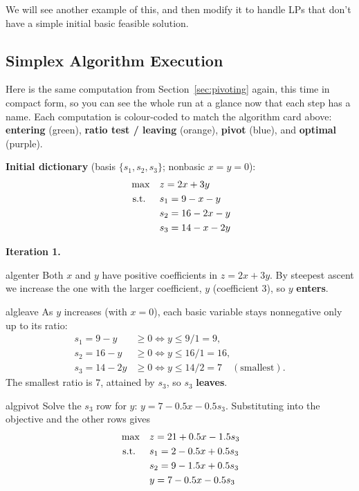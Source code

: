 We will see another example of this, and then modify it to handle LPs that don't have a simple initial basic feasible solution.

\subsection{Simplex Algorithm Execution}

Here is the same computation from Section~\ref{sec:pivoting} again, this time in compact form, so you can see the whole run at a glance now that each step has a name. Each computation is colour-coded to match the algorithm card above: {\color{algenter}\textbf{entering}} (green), {\color{algleave}\textbf{ratio test / leaving}} (orange), {\color{algpivot}\textbf{pivot}} (blue), and {\color{algopt}\textbf{optimal}} (purple).

\noindent\textbf{Initial dictionary} (basis \(\{s_1,s_2,s_3\}\); nonbasic \(x=y=0\)):
\[
\begin{aligned}
\max\quad & z = 2x + 3y \\
\text{ s.t. }\quad  & s_1 = 9 - x - y \\
          & s_2 = 16 - 2x - y \\
          & s_3 = 14 - x - 2y
\end{aligned}
\]

\noindent\textbf{Iteration 1.}
\begin{steppanel}{algenter}
 Both \(x\) and \(y\) have positive coefficients in \(z = 2x + 3y\). By steepest ascent we increase the one with the larger coefficient, \(y\) (coefficient \(3\)), so \(y\) \textbf{enters}.
\end{steppanel}
\begin{steppanel}{algleave}
 As \(y\) increases (with \(x=0\)), each basic variable stays nonnegative only up to its ratio:
\[
\begin{aligned}
s_1 = 9 - y   &\ge 0 \iff y \le 9/1  = 9,\\
s_2 = 16 - y  &\ge 0 \iff y \le 16/1 = 16,\\
s_3 = 14 - 2y &\ge 0 \iff y \le 14/2 = 7 \quad(\text{smallest}).
\end{aligned}
\]
The smallest ratio is \(7\), attained by \(s_3\), so \(s_3\) \textbf{leaves}.
\end{steppanel}
\begin{steppanel}{algpivot}
 Solve the \(s_3\) row for \(y\): \(y = 7 - 0.5x - 0.5s_3\). Substituting into the objective and the other rows gives
\[
\begin{aligned}
\max\quad & z = 21 + 0.5x - 1.5s_3 \\
\text{ s.t. }\quad  & s_1 = 2 - 0.5x + 0.5s_3 \\
          & s_2 = 9 - 1.5x + 0.5s_3 \\
          & y = 7 - 0.5x - 0.5s_3
\end{aligned}
\]
\end{steppanel}

